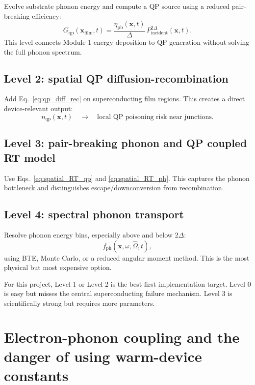 \documentclass[11pt]{article}
\newcommand{\nqp}{n_{\mathrm{qp}}}
\newcommand{\xiPB}{\eta_{\mathrm{pb}}}
\newcommand{\x}{\mathbf{x}}
\begin{document}
Evolve substrate phonon energy and compute a QP source using a reduced pair-breaking efficiency:
\begin{equation}
G_{\mathrm{qp}}(\x_{\mathrm{film}},t)=\frac{\xiPB(\x,t)}{\Delta}\,P_{\mathrm{incident}}^{2\Delta}(\x,t).
\end{equation}
This level connects Module 1 energy deposition to QP generation without solving the full phonon spectrum.

\subsection{Level 2: spatial QP diffusion-recombination}

Add Eq.~\eqref{eq:qp_diff_rec} on superconducting film regions. This creates a direct device-relevant output:
\begin{equation}
\nqp(\x,t) \quad \rightarrow \quad \text{local QP poisoning risk near junctions.}
\end{equation}

\subsection{Level 3: pair-breaking phonon and QP coupled RT model}

Use Eqs.~\eqref{eq:spatial_RT_qp} and \eqref{eq:spatial_RT_ph}. This captures the phonon bottleneck and distinguishes escape/downconversion from recombination.

\subsection{Level 4: spectral phonon transport}

Resolve phonon energy bins, especially above and below \(2\Delta\):
\begin{equation}
f_{\mathrm{ph}}(\x,\omega,\hat\Omega,t),
\end{equation}
using BTE, Monte Carlo, or a reduced angular moment method. This is the most physical but most expensive option.

\begin{notebox}
For this project, Level 1 or Level 2 is the best first implementation target. Level 0 is easy but misses the central superconducting failure mechanism. Level 3 is scientifically strong but requires more parameters.
\end{notebox}


\section{Electron-phonon coupling and the danger of using warm-device constants}
\end{document}
